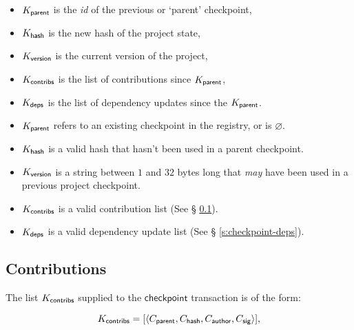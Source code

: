 \begin{itemize}
    \item $K_{\mathsf{parent}}$ is the \emph{id} of the previous or `parent' checkpoint,
    \item $K_{\mathsf{hash}}$ is the new hash of the project state,
    \item $K_{\mathsf{version}}$ is the current version of the project,
    \item $K_{\mathsf{contribs}}$ is the list of contributions since $K_{\mathsf{parent}}$,
    \item $K_{\mathsf{deps}}$ is the list of dependency updates since the $K_{\mathsf{parent}}$.
\end{itemize}
\validation
\begin{itemize}
    \item{$K_{\mathsf{parent}}$ refers to an existing checkpoint in the registry,
        or is $\varnothing$.}
    \item{$K_{\mathsf{hash}}$ is a valid hash that hasn't been used in a parent
        checkpoint.}
    \item{$K_{\mathsf{version}}$ is a string between $1$ and $32$ bytes long that
        \emph{may} have been used in a previous project checkpoint.}
    \item{$K_{\mathsf{contribs}}$ is a valid contribution list (See \S
        \ref{s:checkpoint-contribs}).}
    \item{$K_{\mathsf{deps}}$ is a valid dependency update list (See \S
        \ref{s:checkpoint-deps}).}
\end{itemize}

\subsection{Contributions}
\label{s:checkpoint-contribs}
The list $K_{\mathsf{contribs}}$ supplied to the $\mathsf{checkpoint}$
transaction is of the form:

\[
    K_{\mathsf{contribs}} = [\langle C_{\mathsf{parent}}, C_{\mathsf{hash}},
    C_{\mathsf{author}}, C_{\mathsf{sig}}\rangle],
\]

